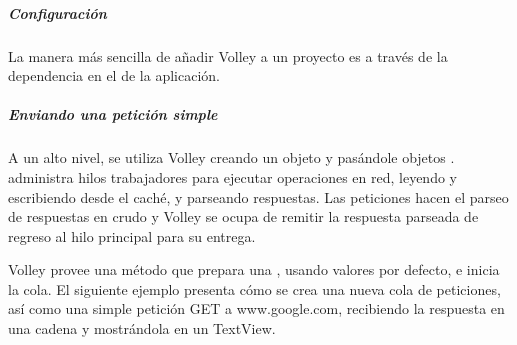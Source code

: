 \subparagraph{Configuración}
\label{\detokenize{dev_docs:id2}}
La manera más sencilla de añadir Volley a un proyecto es a través de la dependencia
en el  de la aplicación.

%
\begin{sphinxVerbatim}[commandchars=\\\{\}]
 
 
\end{sphinxVerbatim}


\subparagraph{Enviando una petición simple}
\label{\detokenize{dev_docs:enviando-una-peticion-simple}}
A un alto nivel, se utiliza Volley creando un objeto  y
pasándole objetos .  administra hilos trabajadores
para ejecutar operaciones en red, leyendo y escribiendo desde el caché, y
parseando respuestas. Las peticiones hacen el parseo de respuestas en crudo
y Volley se ocupa de remitir la respuesta parseada de regreso al hilo principal
para su entrega.

Volley provee una método  que prepara una
, usando valores por defecto, e inicia la cola. El
siguiente ejemplo presenta cómo se crea una nueva cola de peticiones,
así como una simple petición GET a www.google.com, recibiendo  la respuesta
en una cadena y mostrándola en un TextView.

